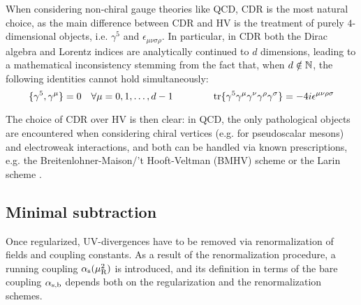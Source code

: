 When considering non-chiral gauge theories like QCD, CDR is the most natural choice, as the main difference between CDR and HV is the treatment of purely $ 4 $-dimensional objects, i.e. $ \gamma^5 $ and $ \epsilon_{\mu \nu \sigma \rho} $. In particular, in CDR both the Dirac algebra and Lorentz indices are analytically continued to $ d $ dimensions, leading to a mathematical inconsistency stemming from the fact that, when $ d \notin \mathbb{N} $, the following identities cannot hold simultaneously\footnotemark:
\begin{equation*}
  \{\gamma^5 , \gamma^\mu\} = 0 \quad \forall \mu = 0, 1, \dots, d-1
  \qquad \qquad
  \operatorname{tr}\{\gamma^5 \gamma^\mu \gamma^\nu \gamma^\rho \gamma^\sigma\} = -4 i \epsilon^{\mu \nu \rho \sigma}
\end{equation*}


The choice of CDR over HV is then clear: in QCD, the only pathological objects are encountered when considering chiral vertices (e.g. for pseudoscalar mesons) and electroweak interactions, and both can be handled via known prescriptions, e.g. the Breitenlohner-Maison/'t Hooft-Veltman (BMHV) scheme \cite{Breitenlohner-1977} or the Larin scheme \cite{Larin-1993}.

\subsection{Minimal subtraction}
\label{ssec:min-sub}

Once regularized, UV-divergences have to be removed via renormalization of fields and coupling constants. As a result of the renormalization procedure, a running coupling $ \alpha_\text{s}(\mu_\text{R}^2) $ is introduced, and its definition in terms of the bare coupling $ \alpha_\text{s,b} $ depends both on the regularization and the renormalization schemes.

